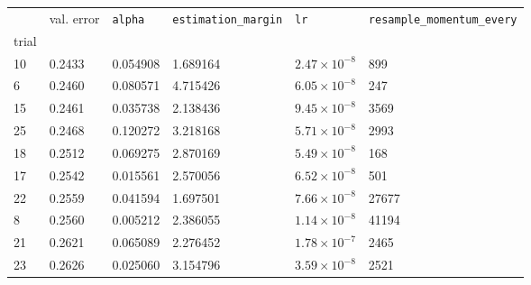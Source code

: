 \begin{tabular}{lp{2.3cm}p{2.3cm}p{2.3cm}p{2.3cm}p{2.3cm}}
\toprule
{} &  val. error &  \texttt{alpha} &  \texttt{estimation\_margin} &         \texttt{lr} &  \texttt{resample\_momentum\_every} \\
trial &             &                 &                              &                     &                                     \\
\midrule
10    &      0.2433 &        0.054908 &                     1.689164 & $2.47\times10^{-8}$ &                                 899 \\
6     &      0.2460 &        0.080571 &                     4.715426 & $6.05\times10^{-8}$ &                                 247 \\
15    &      0.2461 &        0.035738 &                     2.138436 & $9.45\times10^{-8}$ &                                3569 \\
25    &      0.2468 &        0.120272 &                     3.218168 & $5.71\times10^{-8}$ &                                2993 \\
18    &      0.2512 &        0.069275 &                     2.870169 & $5.49\times10^{-8}$ &                                 168 \\
17    &      0.2542 &        0.015561 &                     2.570056 & $6.52\times10^{-8}$ &                                 501 \\
22    &      0.2559 &        0.041594 &                     1.697501 & $7.66\times10^{-8}$ &                               27677 \\
8     &      0.2560 &        0.005212 &                     2.386055 & $1.14\times10^{-8}$ &                               41194 \\
21    &      0.2621 &        0.065089 &                     2.276452 & $1.78\times10^{-7}$ &                                2465 \\
23    &      0.2626 &        0.025060 &                     3.154796 & $3.59\times10^{-8}$ &                                2521 \\
\bottomrule
\end{tabular}
